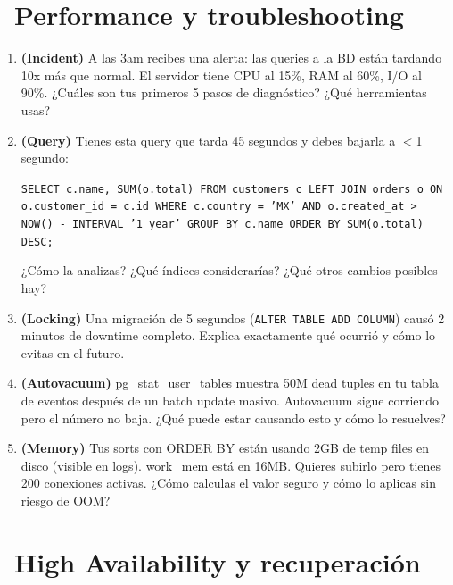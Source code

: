 \section[Performance y troubleshooting]{~Performance y troubleshooting}

\begin{entrevistabox}
\begin{enumerate}
  \item \textbf{(Incident)} A las 3am recibes una alerta: las queries a la BD están tardando 10x más que normal. El servidor tiene CPU al 15\%, RAM al 60\%, I/O al 90\%. ¿Cuáles son tus primeros 5 pasos de diagnóstico? ¿Qué herramientas usas?

  \item \textbf{(Query)} Tienes esta query que tarda 45 segundos y debes bajarla a $<$1 segundo:
  \begin{small}
  \texttt{SELECT c.name, SUM(o.total) FROM customers c LEFT JOIN orders o ON o.customer\_id = c.id WHERE c.country = 'MX' AND o.created\_at > NOW() - INTERVAL '1 year' GROUP BY c.name ORDER BY SUM(o.total) DESC;}
  \end{small}
  ¿Cómo la analizas? ¿Qué índices considerarías? ¿Qué otros cambios posibles hay?

  \item \textbf{(Locking)} Una migración de 5 segundos (\texttt{ALTER TABLE ADD COLUMN}) causó 2 minutos de downtime completo. Explica exactamente qué ocurrió y cómo lo evitas en el futuro.

  \item \textbf{(Autovacuum)} pg\_stat\_user\_tables muestra 50M dead tuples en tu tabla de eventos después de un batch update masivo. Autovacuum sigue corriendo pero el número no baja. ¿Qué puede estar causando esto y cómo lo resuelves?

  \item \textbf{(Memory)} Tus sorts con ORDER BY están usando 2GB de temp files en disco (visible en logs). work\_mem está en 16MB. Quieres subirlo pero tienes 200 conexiones activas. ¿Cómo calculas el valor seguro y cómo lo aplicas sin riesgo de OOM?
\end{enumerate}
\end{entrevistabox}

\section[High Availability y recuperación]{~High Availability y recuperación}

